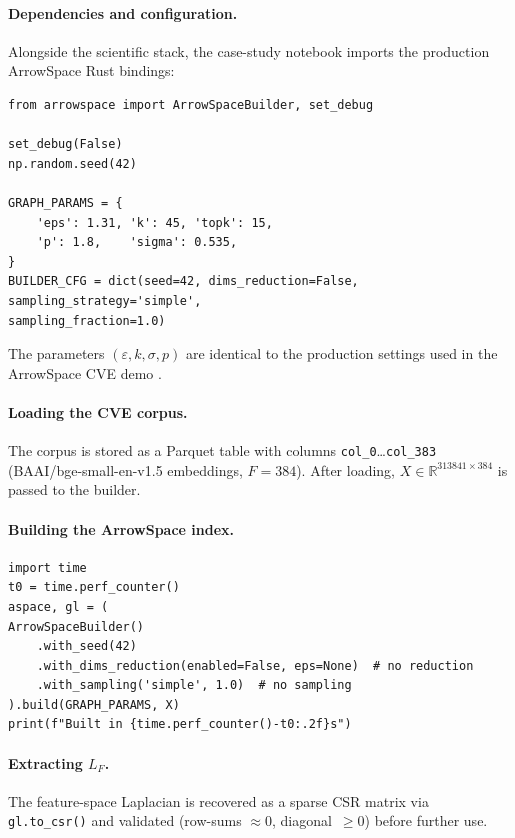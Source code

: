 \documentclass[12pt,a4paper]{article}
\theoremstyle{plain}
\theoremstyle{definition}
\theoremstyle{remark}
\newcommand{\R}{\mathbb{R}}
\newcommand{\1}{\mathbf{1}}
\begin{document}
	\paragraph{Dependencies and configuration.}
	Alongside the scientific stack, the case-study notebook imports the
	production ArrowSpace Rust bindings:
	
	\begin{lstlisting}[caption={Imports and ArrowSpace bindings},
		label={lst:imports01}]
from arrowspace import ArrowSpaceBuilder, set_debug

set_debug(False)
np.random.seed(42)

GRAPH_PARAMS = {
	'eps': 1.31, 'k': 45, 'topk': 15,
	'p': 1.8,    'sigma': 0.535,
}
BUILDER_CFG = dict(seed=42, dims_reduction=False,
sampling_strategy='simple',
sampling_fraction=1.0)
	\end{lstlisting}
	
	The parameters $(\varepsilon, k, \sigma, p)$ are identical to the
	production settings used in the ArrowSpace CVE demo
	\citep{Moriondo2025ArrowSpace}.
	
	\paragraph{Loading the CVE corpus.}
	The corpus is stored as a Parquet table with columns
	\texttt{col\_0}\ldots\texttt{col\_383} (BAAI/bge-small-en-v1.5
	embeddings, $F=384$).
	After loading, $X\in\R^{313841\times 384}$ is passed to the builder.
	
	\paragraph{Building the ArrowSpace index.}
	
	\begin{lstlisting}[caption={Building the production ArrowSpace index on CVE},
		label={lst:build}]
import time
t0 = time.perf_counter()
aspace, gl = (
ArrowSpaceBuilder()
	.with_seed(42)
	.with_dims_reduction(enabled=False, eps=None)  # no reduction
	.with_sampling('simple', 1.0)  # no sampling
).build(GRAPH_PARAMS, X)
print(f"Built in {time.perf_counter()-t0:.2f}s")
	\end{lstlisting}
	
	\paragraph{Extracting $L_F$.}
	The feature-space Laplacian is recovered as a sparse CSR matrix via
	\texttt{gl.to\_csr()} and validated (row-sums $\approx 0$,
	diagonal~$\geq 0$) before further use.
	
\end{document}
